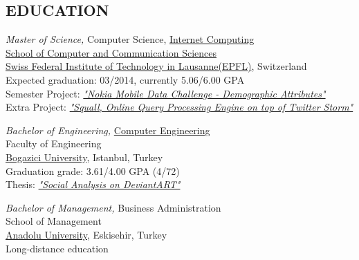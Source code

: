 \documentclass[line, margin]{res}
\begin{document}
\address{Avenue de Rhodanie 64 Chambre 524, 1007 Lausanne Switzerland, (+41) 78 926 9917}
\address{\href{mailto:ferhat.elmas@epfl.ch}{ferhat.elmas@epfl.ch} \hspace{1.75cm} \href{http://ferhatelmas.com}{ferhatelmas.com} \hspace{1.75cm}  \href{https://github.com/ferhatelmas}{github.com/ferhatelmas}}
 
\begin{resume}
 
\vspace{-0.4cm} 
  
\section{EDUCATION}
	{\sl Master of Science,} Computer Science, \href{http://ic.epfl.ch/specializations#content}{Internet Computing} \\
	\href{http://ic.epfl.ch}{School of Computer and Communication Sciences} \\
	\href{http://epfl.ch}{Swiss Federal Institute of Technology in Lausanne(EPFL)}, Switzerland \\
	Expected graduation: 03/2014, currently 5.06/6.00 GPA \\
	Semester Project: \textit{\href{http://research.nokia.com/page/12000}{"Nokia Mobile Data Challenge - Demographic Attributes"}} \\
	Extra Project: \textit{\href{https://github.com/epfldata/squall}{"Squall, Online Query Processing Engine on top of Twitter Storm"}}
 
	{\sl Bachelor of Engineering,} \href{http://www.cmpe.boun.edu.tr/}{Computer Engineering} \\
	Faculty of Engineering \\
	\href{http://boun.edu.tr/en-US/Content/Default.aspx}{Bogazici University}, Istanbul, Turkey \\
	Graduation grade: 3.61/4.00 GPA (4/72) \\
	Thesis: \textit{\href{https://github.com/ferhatelmas/deviantART-analysis}{"Social Analysis on DeviantART"}}
 
	{\sl Bachelor of Management,}  Business Administration \\
	School of Management \\
	\href{http://www.anadolu.edu.tr/en/}{Anadolu University}, Eskisehir, Turkey \\          
	Long-distance education


\end{resume}
\end{document}
